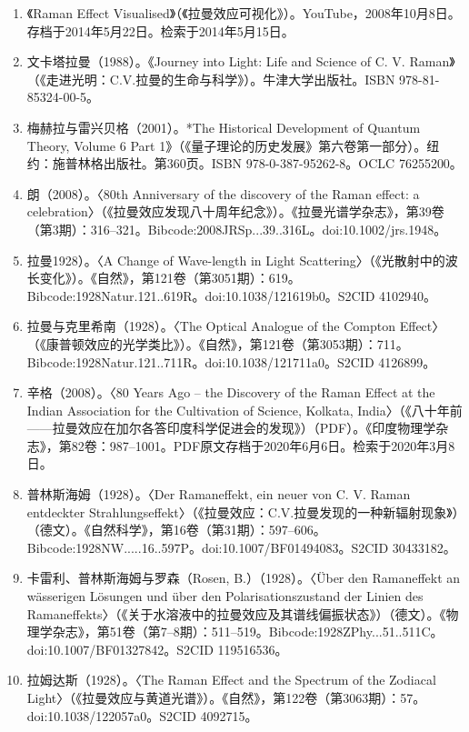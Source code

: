 \begin{enumerate}
\item 《Raman Effect Visualised》（《拉曼效应可视化》）。YouTube，2008年10月8日。存档于2014年5月22日。检索于2014年5月15日。
\item 文卡塔拉曼（1988）。《Journey into Light: Life and Science of C. V. Raman》（《走进光明：C.V.拉曼的生命与科学》）。牛津大学出版社。ISBN 978-81-85324-00-5。
\item 梅赫拉与雷兴贝格（2001）。*The Historical Development of Quantum Theory, Volume 6 Part 1》（《量子理论的历史发展》第六卷第一部分）。纽约：施普林格出版社。第360页。ISBN 978-0-387-95262-8。OCLC 76255200。
\item 朗（2008）。〈80th Anniversary of the discovery of the Raman effect: a celebration〉（《拉曼效应发现八十周年纪念》）。《拉曼光谱学杂志》，第39卷（第3期）：316–321。Bibcode:2008JRSp...39..316L。doi:10.1002/jrs.1948。
\item 拉曼1928）。〈A Change of Wave-length in Light Scattering〉（《光散射中的波长变化》）。《自然》，第121卷（第3051期）：619。Bibcode:1928Natur.121..619R。doi:10.1038/121619b0。S2CID 4102940。
\item 拉曼与克里希南（1928）。〈The Optical Analogue of the Compton Effect〉（《康普顿效应的光学类比》）。《自然》，第121卷（第3053期）：711。Bibcode:1928Natur.121..711R。doi:10.1038/121711a0。S2CID 4126899。
\item 辛格（2008）。〈80 Years Ago – the Discovery of the Raman Effect at the Indian Association for the Cultivation of Science, Kolkata, India〉（《八十年前——拉曼效应在加尔各答印度科学促进会的发现》）（PDF）。《印度物理学杂志》，第82卷：987–1001。PDF原文存档于2020年6月6日。检索于2020年3月8日。
\item 普林斯海姆（1928）。〈Der Ramaneffekt, ein neuer von C. V. Raman entdeckter Strahlungseffekt〉（《拉曼效应：C.V.拉曼发现的一种新辐射现象》）（德文）。《自然科学》，第16卷（第31期）：597–606。Bibcode:1928NW.....16..597P。doi:10.1007/BF01494083。S2CID 30433182。
\item 卡雷利、普林斯海姆与罗森（Rosen, B.）（1928）。〈Über den Ramaneffekt an wässerigen Lösungen und über den Polarisationszustand der Linien des Ramaneffekts〉（《关于水溶液中的拉曼效应及其谱线偏振状态》）（德文）。《物理学杂志》，第51卷（第7–8期）：511–519。Bibcode:1928ZPhy...51..511C。doi:10.1007/BF01327842。S2CID 119516536。
\item 拉姆达斯（1928）。〈The Raman Effect and the Spectrum of the Zodiacal Light〉（《拉曼效应与黄道光谱》）。《自然》，第122卷（第3063期）：57。doi:10.1038/122057a0。S2CID 4092715。

\end{enumerate}
